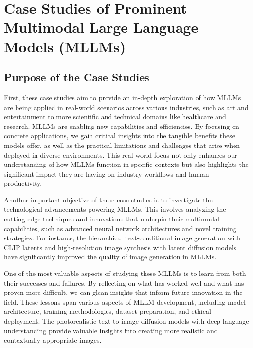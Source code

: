 \chapter{Case Studies of Prominent Multimodal Large Language Models (MLLMs)}



\section{Purpose of the Case Studies}

First, these case studies aim to provide an in-depth exploration of how MLLMs are being applied in real-world scenarios across various industries, such as art and entertainment to more scientific and technical domains like healthcare and research. MLLMs are enabling new capabilities and efficiencies. By focusing on concrete applications, we gain critical insights into the tangible benefits these models offer, as well as the practical limitations and challenges that arise when deployed in diverse environments. This real-world focus not only enhances our understanding of how MLLMs function in specific contexts but also highlights the significant impact they are having on industry workflows and human productivity.

Another important objective of these case studies is to investigate the technological advancements powering MLLMs. This involves analyzing the cutting-edge techniques and innovations that underpin their multimodal capabilities, such as advanced neural network architectures and novel training strategies. For instance, the hierarchical text-conditional image generation with CLIP latents \cite{ramesh2022hierarchical} and high-resolution image synthesis with latent diffusion models \cite{rombach2022high} have significantly improved the quality of image generation in MLLMs.

One of the most valuable aspects of studying these MLLMs is to learn from both their successes and failures. By reflecting on what has worked well and what has proven more difficult, we can glean insights that inform future innovation in the field. These lessons span various aspects of MLLM development, including model architecture, training methodologies, dataset preparation, and ethical deployment. The photorealistic text-to-image diffusion models with deep language understanding \cite{saharia2022photorealistic} provide valuable insights into creating more realistic and contextually appropriate images.

